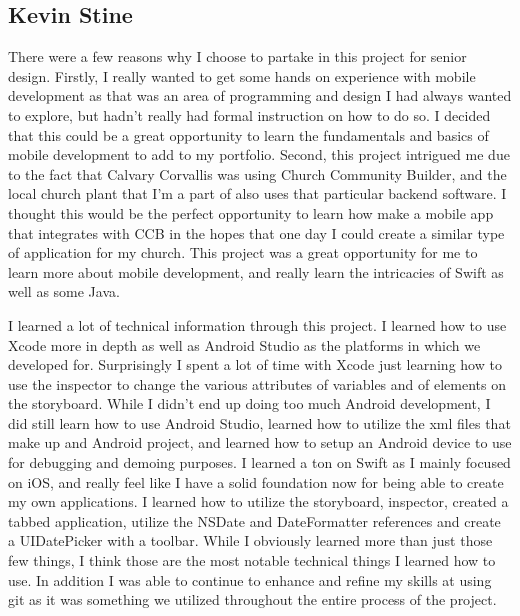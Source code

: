 \documentclass[letterpaper,10pt,draftclsnofoot,onecolumn,titlepage]{IEEEtran}
\begin{document}
	\subsection{Kevin Stine}
		There were a few reasons why I choose to partake in this project for senior design.
		Firstly, I really wanted to get some hands on experience with mobile development as that was an area of programming and design I had always wanted to explore, but hadn't really had formal instruction on how to do so.
		I decided that this could be a great opportunity to learn the fundamentals and basics of mobile development to add to my portfolio.
		Second, this project intrigued me due to the fact that Calvary Corvallis was using Church Community Builder, and the local church plant that I'm a part of also uses that particular backend software.
		I thought this would be the perfect opportunity to learn how make a mobile app that integrates with CCB in the hopes that one day I could create a similar type of application for my church.
		This project was a great opportunity for me to learn more about mobile development, and really learn the intricacies of Swift as well as some Java.

		I learned a lot of technical information through this project.
		I learned how to use Xcode more in depth as well as Android Studio as the platforms in which we developed for.
		Surprisingly I spent a lot of time with Xcode just learning how to use the inspector to change the various attributes of variables and of elements on the storyboard.
		While I didn't end up doing too much Android development, I did still learn how to use Android Studio, learned how to utilize the xml files that make up and Android project, and learned how to setup an Android device to use for debugging and demoing purposes.
		I learned a ton on Swift as I mainly focused on iOS, and really feel like I have a solid foundation now for being able to create my own applications.
		I learned how to utilize the storyboard, inspector, created a tabbed application, utilize the NSDate and DateFormatter references and create a UIDatePicker with a toolbar.
		While I obviously learned more than just those few things, I think those are the most notable technical things I learned how to use.
		In addition I was able to continue to enhance and refine my skills at using git as it was something we utilized throughout the entire process of the project.
\end{document}
